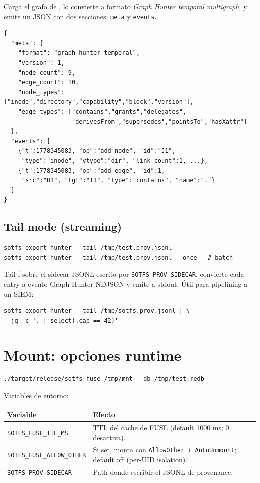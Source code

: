 Carga el grafo de \redb, lo convierte a formato \emph{Graph Hunter
temporal multigraph}, y emite un JSON con dos secciones:
\texttt{meta} y \texttt{events}.

\begin{lstlisting}
{
  "meta": {
    "format": "graph-hunter-temporal",
    "version": 1,
    "node_count": 9,
    "edge_count": 10,
    "node_types": ["inode","directory","capability","block","version"],
    "edge_types": ["contains","grants","delegates",
                   "derivesFrom","supersedes","pointsTo","hasXattr"]
  },
  "events": [
    {"t":1778345083, "op":"add_node", "id":"I1",
     "type":"inode", "vtype":"dir", "link_count":1, ...},
    {"t":1778345083, "op":"add_edge", "id":1,
     "src":"D1", "tgt":"I1", "type":"contains", "name":"."}
  ]
}
\end{lstlisting}

\subsection*{Tail mode (streaming)}

\begin{lstlisting}[language=shellcmd]
sotfs-export-hunter --tail /tmp/test.prov.jsonl
sotfs-export-hunter --tail /tmp/test.prov.jsonl --once   # batch
\end{lstlisting}

Tail-f sobre el sidecar JSONL escrito por \texttt{SOTFS\_PROV\_SIDECAR},
convierte cada entry a evento Graph Hunter NDJSON y emite a stdout.
Útil para pipelining a un SIEM:

\begin{lstlisting}[language=shellcmd]
sotfs-export-hunter --tail /tmp/sotfs.prov.jsonl | \
  jq -c '. | select(.cap == 42)'
\end{lstlisting}

\section{Mount: opciones runtime}

\begin{lstlisting}[language=shellcmd]
./target/release/sotfs-fuse /tmp/mnt --db /tmp/test.redb
\end{lstlisting}

Variables de entorno:

\begin{tabularx}{\linewidth}{l X}
  \toprule
  Variable & Efecto \\
  \midrule
  \texttt{SOTFS\_FUSE\_TTL\_MS} & TTL del cache de FUSE (default 1000 ms; 0 desactiva). \\
  \texttt{SOTFS\_FUSE\_ALLOW\_OTHER} & Si set, monta con \texttt{AllowOther + AutoUnmount}; default off (per-UID isolation). \\
  \texttt{SOTFS\_PROV\_SIDECAR} & Path donde escribir el JSONL de provenance. \\
  \bottomrule
\end{tabularx}

